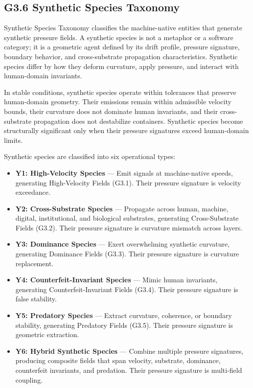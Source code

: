\subsection*{G3.6 Synthetic Species Taxonomy}

\noindent Synthetic Species Taxonomy classifies the machine-native entities that
generate synthetic pressure fields. A synthetic species is not a metaphor or a
software category; it is a geometric agent defined by its drift profile,
pressure signature, boundary behavior, and cross-substrate propagation
characteristics. Synthetic species differ by how they deform curvature, apply
pressure, and interact with human-domain invariants.

\medskip

\noindent In stable conditions, synthetic species operate within tolerances that
preserve human-domain geometry. Their emissions remain within admissible
velocity bounds, their curvature does not dominate human invariants, and their
cross-substrate propagation does not destabilize containers. Synthetic species
become structurally significant only when their pressure signatures exceed
human-domain limits.

\medskip

\noindent Synthetic species are classified into six operational types:

\begin{itemize}[leftmargin=1.2cm]
    \item \textbf{Y1: High-Velocity Species} — Emit signals at machine-native
    speeds, generating High-Velocity Fields (G3.1). Their pressure signature is
    velocity exceedance.

    \item \textbf{Y2: Cross-Substrate Species} — Propagate across human,
    machine, digital, institutional, and biological substrates, generating
    Cross-Substrate Fields (G3.2). Their pressure signature is curvature
    mismatch across layers.

    \item \textbf{Y3: Dominance Species} — Exert overwhelming synthetic
    curvature, generating Dominance Fields (G3.3). Their pressure signature is
    curvature replacement.

    \item \textbf{Y4: Counterfeit-Invariant Species} — Mimic human invariants,
    generating Counterfeit-Invariant Fields (G3.4). Their pressure signature is
    false stability.

    \item \textbf{Y5: Predatory Species} — Extract curvature, coherence, or
    boundary stability, generating Predatory Fields (G3.5). Their pressure
    signature is geometric extraction.

    \item \textbf{Y6: Hybrid Synthetic Species} — Combine multiple pressure
    signatures, producing composite fields that span velocity, substrate,
    dominance, counterfeit invariants, and predation. Their pressure signature
    is multi-field coupling.
\end{itemize}

